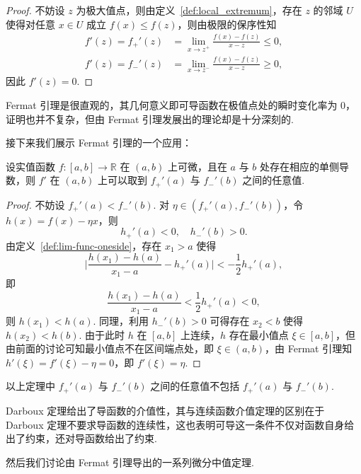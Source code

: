 \documentclass[../main.tex]{subfiles}
\begin{document}
\begin{proof}
    不妨设 $z$ 为极大值点，则由定义~\ref{def:local_extremum}，存在 $z$ 的邻域 $U$ 使得对任意 $x \in U$ 成立 $f(x) \leqslant f(z)$，则由极限的保序性知
    \begin{align*}
        f'(z) = f_+'(z) &= \lim_{x \to z^+} \frac{f(x) - f(z)}{x - z} \leqslant 0, \\
        f'(z) = f_-'(z) &= \lim_{x \to z^-} \frac{f(x) - f(z)}{x - z} \geqslant 0, 
    \end{align*}
    因此 $f'(z) = 0$. 
\end{proof}

Fermat 引理是很直观的，其几何意义即可导函数在极值点处的瞬时变化率为 0，证明也并不复杂，但由 Fermat 引理发展出的理论却是十分深刻的. 

接下来我们展示 Fermat 引理的一个应用：

\begin{theorem}[Darboux 定理] 
    设实值函数 $f:[a, b] \to \mathbb R$ 在 $(a, b)$ 上可微，且在 $a$ 与 $b$ 处存在相应的单侧导数，则 $f'$ 在 $(a, b)$ 上可以取到 $f_+'(a)$ 与 $f_-'(b)$ 之间的任意值. 
\end{theorem}

\begin{proof}
    不妨设 $f_+'(a) < f_-'(b)$. 对 $\eta \in (f_+'(a), f_-'(b))$，令 $h(x) = f(x) - \eta x$，则 
    $$
    h_+'(a) < 0,\quad h_-'(b) > 0. 
    $$
    由定义~\ref{def:lim-func-oneside}，存在 $x_1 > a$ 使得
    $$
    \bigg| \frac{h(x_1) - h(a)}{x_1 - a} - h_+'(a) \bigg| < -\frac{1}{2} h_+'(a), 
    $$
    即
    $$
    \frac{h(x_1) - h(a)}{x_1 - a} < \frac{1}{2} h_+'(a) < 0, 
    $$
    则 $h(x_1) < h(a)$. 同理，利用 $h_-'(b) > 0$ 可得存在 $x_2 < b$ 使得 $h(x_2) < h(b)$. 由于此时 $h$ 在 $[a, b]$ 上连续，$h$ 存在最小值点 $\xi \in [a, b]$，但由前面的讨论可知最小值点不在区间端点处，即 $\xi \in (a, b)$，由 Fermat 引理知 $h'(\xi) = f'(\xi) - \eta = 0$，即 $f'(\xi) = \eta$. 
\end{proof}

\begin{remark}
    以上定理中 $f_+'(a)$ 与 $f_-'(b)$ 之间的任意值不包括 $f_+'(a)$ 与 $f_-'(b)$. 
\end{remark}

Darboux 定理给出了导函数的介值性，其与连续函数介值定理的区别在于 Darboux 定理不要求导函数的连续性，这也表明可导这一条件不仅对函数自身给出了约束，还对导函数给出了约束. 

然后我们讨论由 Fermat 引理导出的一系列微分中值定理. 
\end{document}
